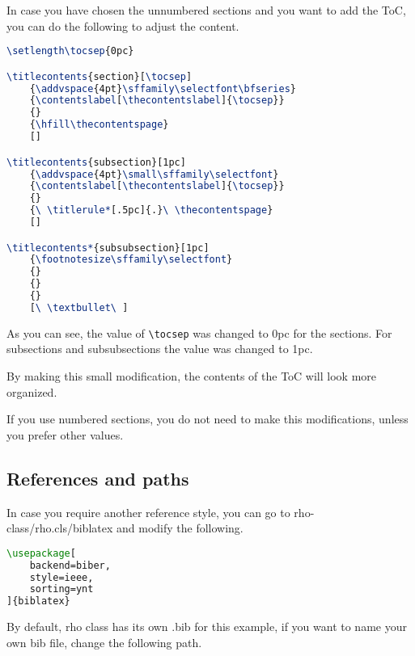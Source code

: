 \documentclass[9pt,a4paper,twoside]{rho-class/rho}
\begin{document}
        In case you have chosen the unnumbered sections and you want to add the ToC, you can do the following to adjust the content.

\nolinenumbers
\begin{lstlisting}[language=TeX, caption=ToC when unnumbered section is chosen.]
\setlength\tocsep{0pc}

\titlecontents{section}[\tocsep]
    {\addvspace{4pt}\sffamily\selectfont\bfseries}
    {\contentslabel[\thecontentslabel]{\tocsep}}
    {}
    {\hfill\thecontentspage}
    []

\titlecontents{subsection}[1pc]
    {\addvspace{4pt}\small\sffamily\selectfont}
    {\contentslabel[\thecontentslabel]{\tocsep}}
    {}
    {\ \titlerule*[.5pc]{.}\ \thecontentspage}
    []

\titlecontents*{subsubsection}[1pc]
    {\footnotesize\sffamily\selectfont}
    {}
    {}
    {}
    [\ \textbullet\ ]
\end{lstlisting}
\linenumbers

        As you can see, the value of \verb|\tocsep| was changed to 0pc for the sections. For subsections and subsubsections the value was changed to 1pc.

        By making this small modification, the contents of the ToC will look more organized.

        If you use numbered sections, you do not need to make this modifications, unless you prefer other values.

    \subsection{References and paths}

        In case you require another reference style, you can go to rho-class/rho.cls/biblatex and modify the following. 

\nolinenumbers
\begin{lstlisting}[language=TeX, caption=Reference code.]
\usepackage[
    backend=biber,
    style=ieee,
    sorting=ynt
]{biblatex}
\end{lstlisting}
\linenumbers

        By default, rho class has its own .bib for this example, if you want to name your own bib file, change the following path.

\nolinenumbers
\begin{lstlisting}[language=TeX]

\end{lstlisting}
\linenumbers
\end{document}
